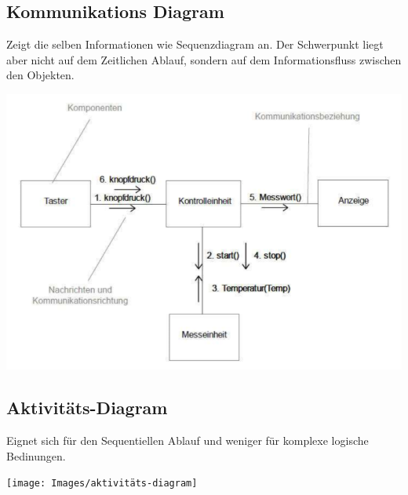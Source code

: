 \subsection{Kommunikations Diagram}
Zeigt die selben Informationen wie Sequenzdiagram an. Der Schwerpunkt liegt aber nicht auf dem Zeitlichen Ablauf, sondern auf dem Informationsfluss zwischen den Objekten.
\begin{center}
	\includegraphics[width=\columnwidth]{Images/kommunikations-diagram}
\end{center}

\subsection{Aktivitäts-Diagram}
Eignet sich für den Sequentiellen Ablauf und weniger für komplexe logische Bedinungen.
\begin{center}
	\texttt{[image: Images/aktivitäts-diagram]}
\end{center}
